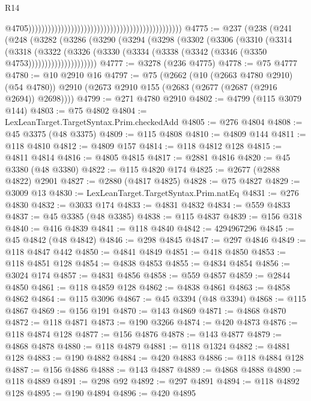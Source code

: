 \begin{lexlean}{R14}
\begin{coremodule}
{{{{{{{{{{{{{{{{{{{{{{{{{{{{{{{{{{{{{{{{{{{{{{{{{{{{{{{{{{{{{{{{{{{{{{{{{{{{{{{{{{                                                                                                  @4705)))))))))))))))))))))))))))))))))))))))))))))))
@4775 := @237
    (@238
      (@241
        (@248
          (@3282
            (@3286
              (@3290
                (@3294
                  (@3298
                    (@3302
                      (@3306
                        (@3310
                          (@3314
                            (@3318
                              (@3322
                                (@3326
                                  (@3330
                                    (@3334 (@3338 (@3342 (@3346 (@3350 @4753)))))))))))))))))))))
@4777 := @3278 (@236 @4775)
@4778 := @75 @4777
@4780 := @10 @2910 @16
@4797 := @75
    (@2662
      (@10 (@2663 @4780 @2910) (@54 @4780))
      @2910
      (@2673 @2910 @155 (@2683 (@2677 (@2687 (@2916 @2694)) @2698))))
@4799 := @271 @4780 @2910
@4802 := @4799 (@115 @3079 @144)
@4803 := @75 @4802
@4804 := LexLeanTarget.TargetSyntax.Prim.checkedAdd
@4805 := @276 @4804
@4808 := @45 @3375 (@48 @3375)
@4809 := @115 @4808
@4810 := @4809 @144
@4811 := @118 @4810
@4812 := @4809 @157
@4814 := @118 @4812 @128
@4815 := @4811 @4814
@4816 := @4805 @4815
@4817 := @2881 @4816
@4820 := @45 @3380 (@48 @3380)
@4822 := @115 @4820 @174
@4825 := @2677 (@2888 @4822) @2901
@4827 := @2880 (@4817 @4825)
@4828 := @75 @4827
@4829 := @3009 @13
@4830 := LexLeanTarget.TargetSyntax.Prim.natEq
@4831 := @276 @4830
@4832 := @3033 @174
@4833 := @4831 @4832
@4834 := @559 @4833
@4837 := @45 @3385 (@48 @3385)
@4838 := @115 @4837
@4839 := @156 @318
@4840 := @416 @4839
@4841 := @118 @4840
@4842 := 4294967296
@4845 := @45 @4842 (@48 @4842)
@4846 := @298 @4845
@4847 := @297 @4846
@4849 := @118 @4847 @442
@4850 := @4841 @4849
@4851 := @418 @4850
@4853 := @118 @4851 @128
@4854 := @4838 @4853
@4855 := @4834 @4854
@4856 := @3024 @174
@4857 := @4831 @4856
@4858 := @559 @4857
@4859 := @2844 @4850
@4861 := @118 @4859 @128
@4862 := @4838 @4861
@4863 := @4858 @4862
@4864 := @115 @3096
@4867 := @45 @3394 (@48 @3394)
@4868 := @115 @4867
@4869 := @156 @191
@4870 := @143 @4869
@4871 := @4868 @4870
@4872 := @118 @4871
@4873 := @190 @3266
@4874 := @420 @4873
@4876 := @118 @4874 @128
@4877 := @156 @4876
@4878 := @143 @4877
@4879 := @4868 @4878
@4880 := @118 @4879
@4881 := @118 @1324
@4882 := @4881 @128
@4883 := @190 @4882
@4884 := @420 @4883
@4886 := @118 @4884 @128
@4887 := @156 @4886
@4888 := @143 @4887
@4889 := @4868 @4888
@4890 := @118 @4889
@4891 := @298 @92
@4892 := @297 @4891
@4894 := @118 @4892 @128
@4895 := @190 @4894
@4896 := @420 @4895
}}}}}}}}}}}}}}}}}}}}}}}}}}}}}}}}}}}}}}}}}}}}}}}}}}}}}}}}}}}}}}}}}}}}}}}}}}}}}}}}}}
\end{coremodule}
\end{lexlean}
